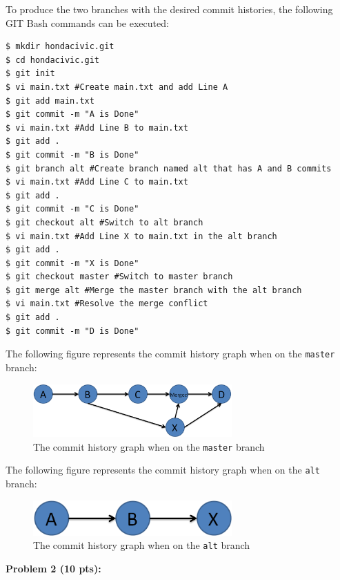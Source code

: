 \documentclass[12pt]{article}
\begin{document}
\noindent To produce the two branches with the desired commit histories, the following GIT Bash commands can be executed:
\begin{lstlisting}
$ mkdir hondacivic.git
$ cd hondacivic.git
$ git init
$ vi main.txt #Create main.txt and add Line A
$ git add main.txt
$ git commit -m "A is Done"
$ vi main.txt #Add Line B to main.txt
$ git add .
$ git commit -m "B is Done"
$ git branch alt #Create branch named alt that has A and B commits
$ vi main.txt #Add Line C to main.txt
$ git add .
$ git commit -m "C is Done"
$ git checkout alt #Switch to alt branch
$ vi main.txt #Add Line X to main.txt in the alt branch
$ git add .
$ git commit -m "X is Done"
$ git checkout master #Switch to master branch
$ git merge alt #Merge the master branch with the alt branch
$ vi main.txt #Resolve the merge conflict
$ git add .
$ git commit -m "D is Done"
\end{lstlisting}  

\noindent The following figure represents the commit history graph when on the \texttt{master} branch:

\begin{figure}[h!]
\begin{center}
\includegraphics[width=3in]{Master2.png}
\end{center}
\caption{The commit history graph when on the \texttt{master} branch}
\end{figure}

\noindent The following figure represents the commit history graph when on the \texttt{alt} branch:

\begin{figure}[h!]
\begin{center}
\includegraphics[width=3in]{Alt.png}
\end{center}
\caption{The commit history graph when on the \texttt{alt} branch}
\end{figure}

\newpage
\noindent\textbf{Problem 2 (10 pts):}
\end{document}
